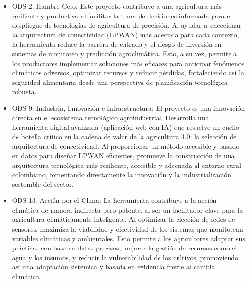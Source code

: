 \begin{itemize}
      \item  ODS 2. Hambre Cero: Este proyecto contribuye a una agricultura más
            resiliente y productiva al facilitar la toma de  decisiones  informada
            para el despliegue de tecnologías  de  agricultura  de  precisión.  Al
            ayudar a seleccionar  la  arquitectura  de  conectividad  (LPWAN)  más
            adecuda para cada  contexto,  la  herramienta  reduce  la  barrera  de
            entrada y el riesgo de inversión en sistemas de monitoreo y predicción
            agroclimática. Esto, a su vez, permite a los  productores  implementar
            soluciones más eficaces para anticipar fenómenos climáticos  adversos,
            optimizar recursos y reducir pérdidas, fortaleciendo así la  seguridad
            alimentaria  desde  una  perspectiva  de   planificación   tecnológica
            robusta.
      \item  ODS 9. Industria, Innovación e Infraestructura: El proyecto es una
            innovación  directa  en  el  ecosistema  tecnológico   agroindustrial.
            Desarrolla una herramienta digital avanzada (aplicación  web  con  IA)
            que resuelve un cuello de botella crítico en la cadena de valor de  la
            agricultura 4.0: la selección  de  arquitectura  de  conectividad.  Al
            proporcionar un método accesible y basado en datos para diseñar
            LPWAN  eficientes,  promueve  la  construcción  de  una   arquitectura
            tecnológica más resiliente, accesible  y  adecuada  al  entorno  rural
            colombiano,   fomentando   directamente    la    innovación    y    la
            industrialización sostenible del sector.
      \item ODS 13. Acción por el Clima: La herramienta contribuye a la acción
            climática de manera indirecta pero  potente,  al  ser  un  facilitador
            clave para la agricultura climáticamente inteligente. Al optimizar  la
            elección de redes de sensores, maximiza la viabilidad y efectividad de
            los sistemas que monitorean variables climáticas y  ambientales.  Esto
            permite a los agricultores adaptar sus prácticas  con  base  en  datos
            precisos, mejorar la gestión de recursos como el agua y los insumos, y
            reducir  la  vulnerabilidad  de  los  cultivos,  promoviendo  así  una
            adaptación sistémica y basada en evidencia frente al cambio climático.
\end{itemize}

